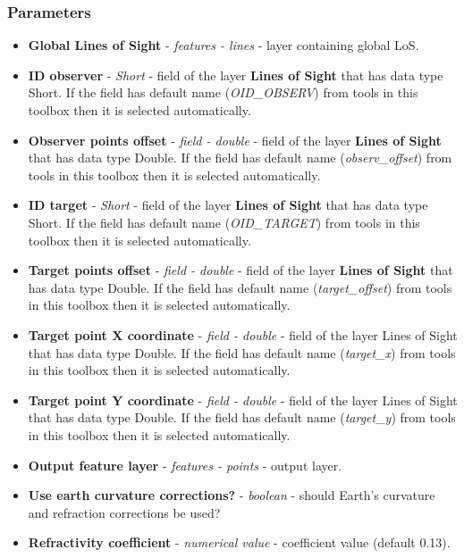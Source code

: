 \documentclass[]{article}
\begin{document}
\subsubsection{Parameters}
\begin{itemize}
	\item \textbf{Global Lines of Sight} - \textit{features - lines} - layer containing global LoS.
	\item \textbf{ID observer} - \textit{Short} - field of the layer \textbf{Lines of Sight} that has data type Short. If the field has default name (\textit{OID\_OBSERV}) from tools in this toolbox then it is selected automatically.
	\item \textbf{Observer points offset} - \textit{field - double} - field of the layer \textbf{Lines of Sight} that has data type Double. If the field has default name (\textit{observ\_offset}) from tools in this toolbox then it is selected automatically.
	\item \textbf{ID target} - \textit{Short} - field of the layer \textbf{Lines of Sight} that has data type Short. If the field has default name (\textit{OID\_TARGET}) from tools in this toolbox then it is selected automatically.
	\item \textbf{Target points offset} - \textit{field - double} - field of the layer \textbf{Lines of Sight} that has data type Double. If the field has default name (\textit{target\_offset}) from tools in this toolbox then it is selected automatically.
	\item \textbf{Target point X coordinate} - \textit{field - double} - field of the layer Lines of Sight that has data type Double. If the field has default name (\textit{target\_x}) from tools in this toolbox then it is selected automatically.
	\item \textbf{Target point Y coordinate} - \textit{field - double} - field of the layer Lines of Sight that has data type Double. If the field has default name (\textit{target\_y}) from tools in this toolbox then it is selected automatically.
	\item \textbf{Output feature layer} - \textit{features - points} - output layer.
	\item \textbf{Use earth curvature corrections?} - \textit{boolean} - should Earth's curvature and refraction corrections be used?
	\item \textbf{Refractivity coefficient} - \textit{numerical value}  - coefficient value (default 0.13).
\end{itemize}
\end{document}
